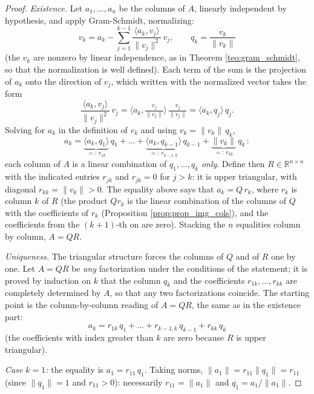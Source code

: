 \documentclass[11pt, a4paper]{article}
\begin{document}
\begin{proof}
\textit{Existence.} Let $a_1, \dots, a_n$ be the columns of $A$, linearly independent by hypothesis, and apply Gram-Schmidt, normalizing:
\[
v_k = a_k - \sum_{j=1}^{k-1} \frac{\langle a_k, v_j \rangle}{\|v_j\|^2} \, v_j, \qquad q_k = \frac{v_k}{\|v_k\|}
\]
(the $v_k$ are nonzero by linear independence, as in Theorem \ref{teo:gram_schmidt}, so that the normalization is well defined). Each term of the sum is the projection of $a_k$ onto the direction of $v_j$, which written with the normalized vector takes the form
\[
\frac{\langle a_k, v_j \rangle}{\|v_j\|^2} \, v_j
= \Big\langle a_k, \tfrac{v_j}{\|v_j\|} \Big\rangle \, \tfrac{v_j}{\|v_j\|}
= \langle a_k, q_j \rangle \, q_j.
\]
Solving for $a_k$ in the definition of $v_k$ and using $v_k = \|v_k\| \, q_k$,
\[
a_k = \underbrace{\langle a_k, q_1 \rangle}_{=: \, r_{1k}} \, q_1 + \dots + \underbrace{\langle a_k, q_{k-1} \rangle}_{=: \, r_{k-1,k}} \, q_{k-1} + \underbrace{\|v_k\|}_{=: \, r_{kk}} \, q_k \, :
\]
each column of $A$ is a linear combination of $q_1, \dots, q_k$ \emph{only}. Define then $R \in \mathbb{R}^{n \times n}$ with the indicated entries $r_{jk}$ and $r_{jk} = 0$ for $j > k$: it is upper triangular, with diagonal $r_{kk} = \|v_k\| > 0$. The equality above says that $a_k = Q \, r_k$, where $r_k$ is column $k$ of $R$ (the product $Q r_k$ is the linear combination of the columns of $Q$ with the coefficients of $r_k$ (Proposition \ref{prop:prop_img_cols}), and the coefficients from the $(k+1)$-th on are zero). Stacking the $n$ equalities column by column, $A = QR$.

\textit{Uniqueness.} The triangular structure forces the columns of $Q$ and of $R$ one by one. Let $A = QR$ be \emph{any} factorization under the conditions of the statement; it is proved by induction on $k$ that the column $q_k$ and the coefficients $r_{1k}, \dots, r_{kk}$ are completely determined by $A$, so that any two factorizations coincide. The starting point is the column-by-column reading of $A = QR$, the same as in the existence part:
\[
a_k = r_{1k} \, q_1 + \dots + r_{k-1,k} \, q_{k-1} + r_{kk} \, q_k
\]
(the coefficients with index greater than $k$ are zero because $R$ is upper triangular).

\textit{Case $k = 1$:} the equality is $a_1 = r_{11} \, q_1$. Taking norms, $\|a_1\| = r_{11} \|q_1\| = r_{11}$ (since $\|q_1\| = 1$ and $r_{11} > 0$): necessarily $r_{11} = \|a_1\|$ and $q_1 = a_1 / \|a_1\|$.


\end{proof}
\end{document}
